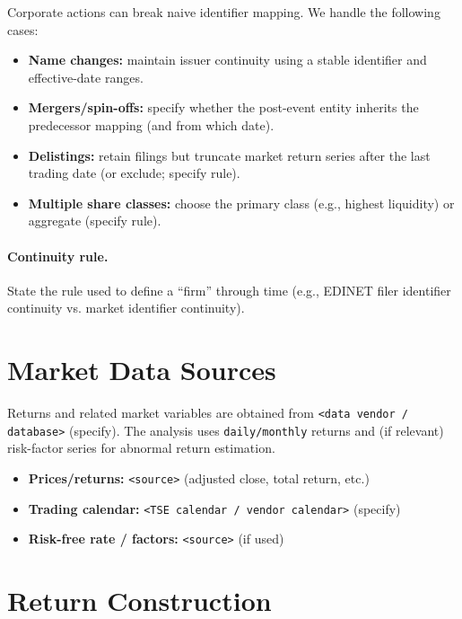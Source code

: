 Corporate actions can break naive identifier mapping. We handle the following cases:

\begin{itemize}
  \item \textbf{Name changes:} maintain issuer continuity using a stable identifier and effective-date ranges.
  \item \textbf{Mergers/spin-offs:} specify whether the post-event entity inherits the predecessor mapping (and from which date).
  \item \textbf{Delistings:} retain filings but truncate market return series after the last trading date (or exclude; specify rule).
  \item \textbf{Multiple share classes:} choose the primary class (e.g., highest liquidity) or aggregate (specify rule).
\end{itemize}

\paragraph{Continuity rule.}
State the rule used to define a ``firm'' through time (e.g., EDINET filer identifier continuity vs. market identifier continuity).

\section{Market Data Sources}
\label{appendix:market_sources}

Returns and related market variables are obtained from \texttt{<data vendor / database>} (specify). The analysis uses \texttt{daily/monthly} returns and (if relevant) risk-factor series for abnormal return estimation.

\begin{itemize}
  \item \textbf{Prices/returns:} \texttt{<source>} (adjusted close, total return, etc.)
  \item \textbf{Trading calendar:} \texttt{<TSE calendar / vendor calendar>} (specify)
  \item \textbf{Risk-free rate / factors:} \texttt{<source>} (if used)
\end{itemize}

\section{Return Construction}
\label{appendix:return_construction}

